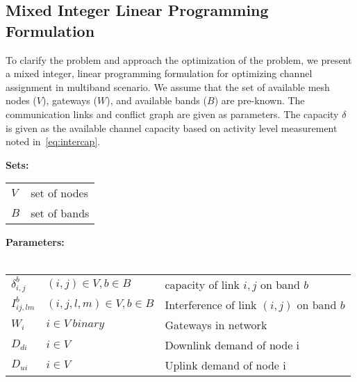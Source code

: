 \subsection{Mixed Integer Linear Programming Formulation}
\label{subsec:linearopt}

To clarify the problem and approach the optimization of the 
problem, we present a mixed integer, linear programming 
formulation for optimizing channel assignment in multiband
scenario. We assume that the set of available mesh nodes 
($V$), gateways ($W$), and available bands ($B$) are pre-known. 
The communication links and conflict graph are given as parameters.
The capacity $\delta$ is given as the available channel capacity
based on activity level measurement noted in~\ref{eq:intercap}. 

\noindent
{\bf Sets:}
\begin{tabular}{ll}
$V$ & set of nodes \\
$B$ & set of bands \\
\end{tabular}

\noindent
{\bf Parameters:}\\
\\
\begin{tabular}{llp{3.4cm}}
$\delta_{i,j}^b$ & $(i,j)\in V, b \in B$ & capacity of link $i,j$ on band $b$\\
$I_{ij,lm}^b$ & $(i,j,l,m) \in V, b\in B $ & Interference of link $(i,j)$ on band $b$\\
$W_i$ & $i \in V\ binary$ & Gateways in network\\
$D_{di}$ & $i \in V\ $ & Downlink demand of node i\\
$D_{ui}$ & $i \in V\ $ & Uplink demand of node i\\
\end{tabular}



